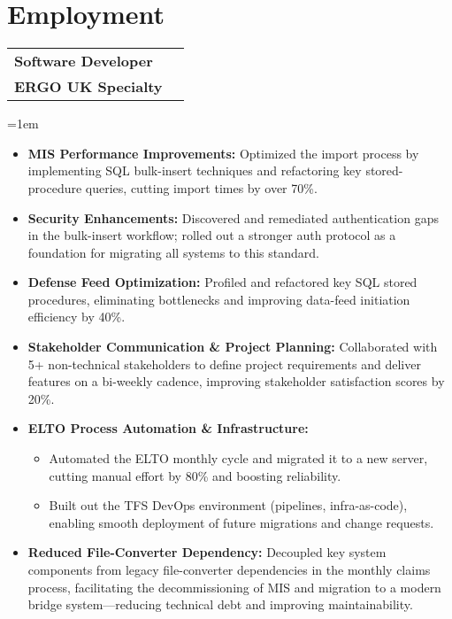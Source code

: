 \documentclass[paper=a4,fontsize=11pt]{article}
\makeatletter
\newcommand{\NewPart}[1]{\section{#1}}
\newcommand{\WorkEntry}[4]{
	\noindent
	\begin{tabularx}{\textwidth}{@{}X r@{}}
		\textbf{\large\color{primary}#1} & \textbf{\color{secondary}#2} \\
		\textbf{\color{secondary}#3} & \\
	\end{tabularx}
	\vspace{4pt}
	\noindent\hangindent=1em\hangafter=0 #4
	\vspace{8pt}
}
\makeatother
\begin{document}
\NewPart{Employment}{}
\WorkEntry{Software Developer}{\textbf{\hspace{-2cm}{August2024–Present}}}{ERGO UK Specialty}{
    \begin{itemize}
        \itemsep-0.1em 
        \item \textbf{MIS Performance Improvements:} Optimized the import process by implementing SQL bulk-insert techniques and refactoring key stored-procedure queries, cutting import times by over 70\%.
        \item \textbf{Security Enhancements:} Discovered and remediated authentication gaps in the bulk-insert workflow; rolled out a stronger auth protocol as a foundation for migrating all systems to this standard.
        \item \textbf{Defense Feed Optimization:} Profiled and refactored key SQL stored procedures, eliminating bottlenecks and improving data-feed initiation efficiency by 40\%.
  \item \textbf{Stakeholder Communication \& Project Planning:} Collaborated with 5+ non-technical stakeholders to define project requirements and deliver features on a bi-weekly cadence, improving stakeholder satisfaction scores by 20\%.
        \item \textbf{ELTO Process Automation \& Infrastructure:}
            \begin{itemize}
                \item Automated the ELTO monthly cycle and migrated it to a new server, cutting manual effort by 80\% and boosting reliability.
                \item Built out the TFS DevOps environment (pipelines, infra-as-code), enabling smooth deployment of future migrations and change requests.
            \end{itemize}
		\item \textbf{Reduced File-Converter Dependency:} Decoupled key system components from legacy file-converter dependencies in the monthly claims process, facilitating the decommissioning of MIS and migration to a modern bridge system—reducing technical debt and improving maintainability.


\end{itemize}}
\end{document}
